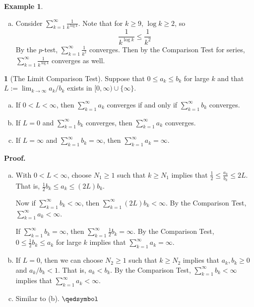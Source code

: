 \documentclass[11pt]{article}
\theoremstyle{definition}
\newtheorem{exmp}[thm]{Example}
\newtheorem{none}[thm]{}
\begin{document}
\begin{exmp}
\begin{enumerate}[(a)]
By the Comparison Test for series, 
$$\sum_{k=1}^\infty b_k < \infty$$
and applying the Comparison Test again,
$$\sum_{k=1}^\infty a_k < \infty$$
That is,
$$\sum_{k=1}^\infty \frac{k^3\log^2k}{e^k} < \infty.$$

\item Consider $\sum_{k=1}^\infty \frac{1}{k^{\log k}}$. Note that for $k \geq 9$, $\log k \geq 2$, so
$$\frac{1}{k^{\log k}} \leq \frac{1}{k^2}$$
By the $p$-test, $\sum_{k=1}^\infty \frac{1}{k^2}$ converges. Then by the Comparison Test for series, $\sum_{k=1}^\infty \frac{1}{k^{\log k}}$ converges as well.

\end{enumerate}
\end{exmp}

\begin{none}[The Limit Comparison Test]
Suppose that $0 \leq a_k \leq b_k$ for large $k$ and that $L := \lim_{k\to\infty} a_k/b_k$ exists in $[0, \infty) \cup \{\infty\}$.
\begin{enumerate}[(a)] \vspace{-0.2cm}
\item If $0 < L < \infty$, then $\sum_{k=1}^\infty a_k$ converges if and only if $\sum_{k=1}^\infty b_k$ converges.
\item If $L = 0$ and $\sum_{k=1}^\infty b_k$ converges, then $\sum_{k=1}^\infty a_k$ converges.
\item If $L = \infty$ and $\sum_{k=1}^\infty b_k = \infty$, then $\sum_{k=1}^\infty a_k = \infty$.
\end{enumerate}
\end{none}
\textbf{Proof.} 
\begin{enumerate}[(a)] \vspace{-0.2cm}

\item With $0 < L < \infty$, choose $N_1 \geq 1$ such that $k \geq N_1$ implies that $\frac12 \leq \frac{a_k}{b_k} \leq 2L$. That is, $\frac12b_k \leq a_k \leq (2L)b_k$. 

Now if $\sum_{k=1}^\infty b_k < \infty$, then $\sum_{k=1}^\infty (2L)b_k < \infty$. By the Comparison Test, $\sum_{k=1}^\infty a_k < \infty$. 

If $\sum_{k=1}^\infty b_k = \infty$, then $\sum_{k=1}^\infty \frac12b_k = \infty$. By the Comparison Test, $0 \leq \frac12b_k \leq a_k$ for large $k$ implies that $\sum_{k=1}^\infty a_k = \infty$. 

\item If $L = 0$, then we can choose $N_2 \geq 1$ such that $k \geq N_2$ implies that $a_k, b_k \geq 0$ and $a_k / b_k < 1$. That is, $a_k < b_k$. By the Comparison Test, $\sum_{k=1}^\infty b_k < \infty$ implies that $\sum_{k=1}^\infty a_k < \infty$.

\item Similar to (b). $\qedsymbol$

\end{enumerate}
\end{document}
